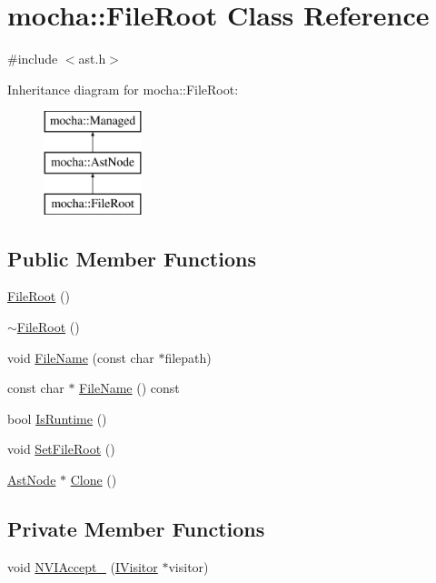 \hypertarget{classmocha_1_1_file_root}{
\section{mocha::FileRoot Class Reference}
\label{classmocha_1_1_file_root}
}


{\ttfamily \#include $<$ast.h$>$}

Inheritance diagram for mocha::FileRoot:\begin{figure}[H]
\begin{center}
\leavevmode
\includegraphics[height=3.000000cm]{classmocha_1_1_file_root}
\end{center}
\end{figure}
\subsection*{Public Member Functions}
\begin{DoxyCompactItemize}
\item 
\hyperlink{classmocha_1_1_file_root_a4187f8dfcf8cfde3c480d32348ad599e}{FileRoot} ()
\item 
\hyperlink{classmocha_1_1_file_root_a3af35d629cf83fbad09bbaa085166eab}{$\sim$FileRoot} ()
\item 
void \hyperlink{classmocha_1_1_file_root_af766366c3935dce897a3fdb833c70946}{FileName} (const char $\ast$filepath)
\item 
const char $\ast$ \hyperlink{classmocha_1_1_file_root_a57407c35fda0bbe2216d38ccddc8ed18}{FileName} () const 
\item 
bool \hyperlink{classmocha_1_1_file_root_aa6a6808576b77df6c909f3251400ba27}{IsRuntime} ()
\item 
void \hyperlink{classmocha_1_1_file_root_a674cea3b318e39b3ed36a6e07752d167}{SetFileRoot} ()
\item 
\hyperlink{classmocha_1_1_ast_node}{AstNode} $\ast$ \hyperlink{classmocha_1_1_file_root_a15c4779b5050481286c6d6cb4cc9223e}{Clone} ()
\end{DoxyCompactItemize}
\subsection*{Private Member Functions}
\begin{DoxyCompactItemize}
\item 
void \hyperlink{classmocha_1_1_file_root_a6cff1c80bcb419835cceaa2106e33b2f}{NVIAccept\_\-} (\hyperlink{classmocha_1_1_i_visitor}{IVisitor} $\ast$visitor)
\end{DoxyCompactItemize}
